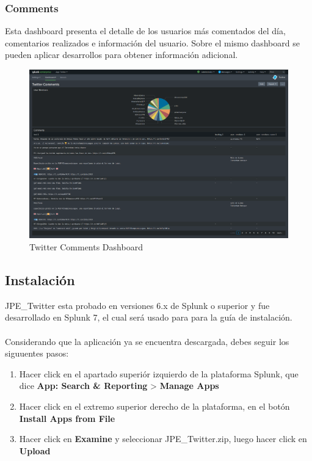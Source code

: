 \documentclass[a4paper]{article}
\begin{document}
\newpage

\subsubsection*{Comments}

Esta dashboard presenta el detalle de los usuarios m\'as comentados del d\'ia, comentarios realizados e informaci\'on del usuario. Sobre el mismo dashboard se pueden aplicar desarrollos para obtener informaci\'on adicional.
\newline
\begin{figure}[h!]
	\centering
	\includegraphics[scale=0.2]{img/comments.png}
	\caption{\color{text}Twitter Comments Dashboard}
\end{figure}

\newpage

\subsection*{Instalaci\'on}

JPE\_Twitter esta probado en versiones 6.x de Splunk o superior y fue desarrollado en Splunk 7, el cual ser\'a usado para para la gu\'ia de instalaci\'on.\\
\\
Considerando que la aplicaci\'on ya se encuentra descargada, debes seguir los siguuentes pasos:
\newline
\begin{enumerate}[label=(\alph*)]
\item Hacer click en el apartado superi\'or izquierdo de la plataforma Splunk, que dice \textbf{App: Search \& Reporting} > \textbf{Manage Apps}
\item Hacer click en el extremo superior derecho de la plataforma, en el bot\'on \textbf{Install Apps from File}
\item Hacer click en \textbf{Examine} y seleccionar JPE\_Twitter.zip, luego hacer click en \textbf{Upload}
\newline
\end{enumerate}
\end{document}
